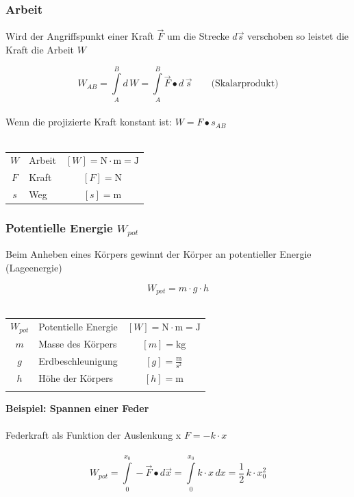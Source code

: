 	\subsubsection{Arbeit}
	
	Wird der Angriffspunkt einer Kraft $\vec{F}$ um die Strecke $d \vec{s}$ verschoben so leistet die Kraft die Arbeit $W$ 
	
	$$ \boxed{ W_{AB} =  \int \limits_A^B d \, W =  \int \limits_A^B \vec{F} \bullet d \, \vec{s} \qquad \text{(Skalarprodukt)} }$$ \\
	
	Wenn die projizierte Kraft konstant ist: $\boxed{ W = F \bullet s_{AB} }$ \\
	\\
	\begin{tabular}{c l c}
	$W$ & Arbeit & $[W] = \mathrm{N \cdot m = J}$ \\
	$F$ & Kraft & $[F] = \mathrm{N}$ \\
	$s$ & Weg & $[s] = \mathrm{m}$ \\
	\end{tabular}

	

	\subsubsection{Potentielle Energie $W_{pot}$}
	Beim Anheben eines Körpers gewinnt der Körper an potentieller Energie (Lageenergie) 
	
	$$ \boxed{ W_{pot} = m \cdot g \cdot h}$$
	\\
	\begin{tabular}{c l c}
	$W_{pot}$ & Potentielle Energie & $[W] = \mathrm{N \cdot m = J}$ \\
	$m$ & Masse des Körpers & $[m] = \mathrm{kg}$ \\
	$g$ & Erdbeschleunigung & $[g] = \mathrm{\frac{m}{s^2}}$ \\
	$h$ & Höhe der Körpers & $[h] = \mathrm{m}$ \\
	\\
	\end{tabular}
	
	\textbf{Beispiel: Spannen einer Feder} \\
	\\  
	Federkraft als Funktion der Auslenkung x \qquad $F = -k \cdot x$ \\
	\\
	$$ \boxed{ W_{pot} = \int \limits_0^{x_0}  - \vec{F} \bullet d \vec{x} = \int \limits_0^{x_0}  k \cdot x \, dx = \frac{1}{2} \, k \cdot x_0^2} $$ \\
	
